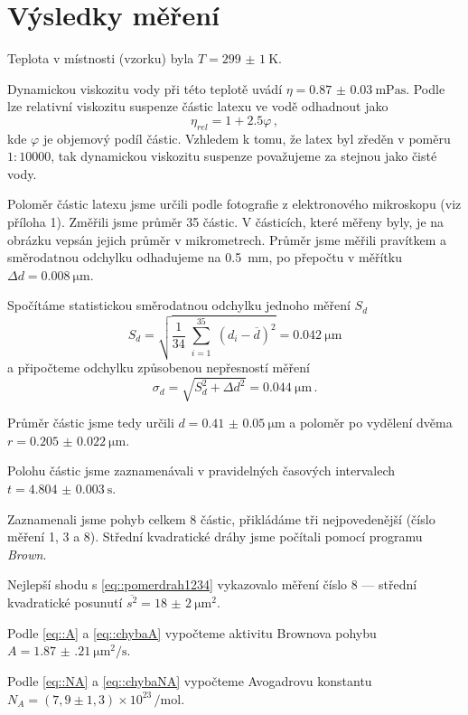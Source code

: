 \section*{Výsledky měření}
Teplota v místnosti (vzorku) byla $T =\SI{299(1)}{\kelvin}$.

Dynamickou viskozitu vody při této teplotě uvádí \cite{viskozita} $\eta=\SI{0.87(3)}{\milli\pascal\s}$.
Podle \cite{skripta} lze relativní viskozitu suspenze částic latexu ve vodě odhadnout jako
\begin{equation}
\eta _{rel} = 1 + \num{2.5}\varphi \,,
\end{equation}
kde $\varphi$ je objemový podíl částic.
Vzhledem k tomu, že latex byl zředěn v poměru $1:\num{10000}$, tak dynamickou viskozitu suspenze považujeme za stejnou jako čisté vody.

Poloměr částic latexu jsme určili podle fotografie z elektronového mikroskopu (viz příloha 1).
Změřili jsme průměr \num{35} částic.
V částicích, které měřeny byly, je na obrázku vepsán jejich průměr v mikrometrech. 
Průměr jsme měřili pravítkem a směrodatnou odchylku odhadujeme na \SI{0.5}{\mm}, po přepočtu v měřítku $\Delta d =\SI{0.008}{\micro\metre}$.

Spočítáme statistickou směrodatnou odchylku jednoho měření $S_d$
\begin{equation}
S_d=\sqrt{  \frac{1}{34} \sum_{\substack{i=1}}^{35} (d_i - \overline{d})^2} = \SI{0.042}{\micro\metre}
\end{equation}
a připočteme odchylku způsobenou nepřesností měření
\begin{equation}
\sigma_d=\sqrt{  S_d^2 + \Delta d^2}=\SI{0.044}{\micro\metre} \,.
\end{equation}

Průměr částic jsme tedy určili $d=\SI{0.41(5)}{\micro\metre}$ a poloměr po vydělení dvěma $r=\SI{0.205(22)}{\micro\metre}$.

Polohu částic jsme zaznamenávali v pravidelných časových intervalech $t=\SI{4.804(3)}{\s}$.

Zaznamenali jsme pohyb celkem \num{8} částic, přikládáme tři nejpovedenější (číslo měření 1, 3 a 8).
Střední kvadratické dráhy jsme počítali pomocí programu \emph{Brown}.

Nejlepší shodu s \eqref{eq::pomerdrah1234} vykazovalo měření číslo 8 --- střední kvadratické posunutí $\overline{s^2}=\SI{18(2)}{\micro\metre\squared}$.

Podle \eqref{eq::A} a \eqref{eq::chybaA} vypočteme aktivitu Brownova pohybu $A=\SI{1.87(21)}{\micro\metre\squared\per\s}$.

Podle \eqref{eq::NA} a \eqref{eq::chybaNA} vypočteme Avogadrovu konstantu $N_A=(7,9 \pm 1,3) \times 10^{23} \,\si{\per\mole}$.